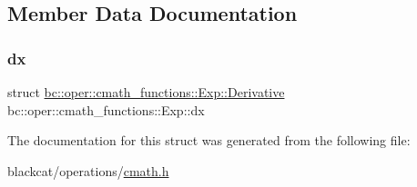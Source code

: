 \subsection{Member Data Documentation}
\mbox{\label{structbc_1_1oper_1_1cmath__functions_1_1Exp_aae67a1886b7fcd438ab94746e57f4b7d}} 
\subsubsection{\texorpdfstring{dx}{dx}}
{\footnotesize\ttfamily struct \hyperlink{structbc_1_1oper_1_1cmath__functions_1_1Exp_1_1Derivative}{bc\+::oper\+::cmath\+\_\+functions\+::\+Exp\+::\+Derivative}   bc\+::oper\+::cmath\+\_\+functions\+::\+Exp\+::dx}



The documentation for this struct was generated from the following file\+:\begin{DoxyCompactItemize}
\item 
blackcat/operations/\hyperlink{cmath_8h}{cmath.\+h}\end{DoxyCompactItemize}
